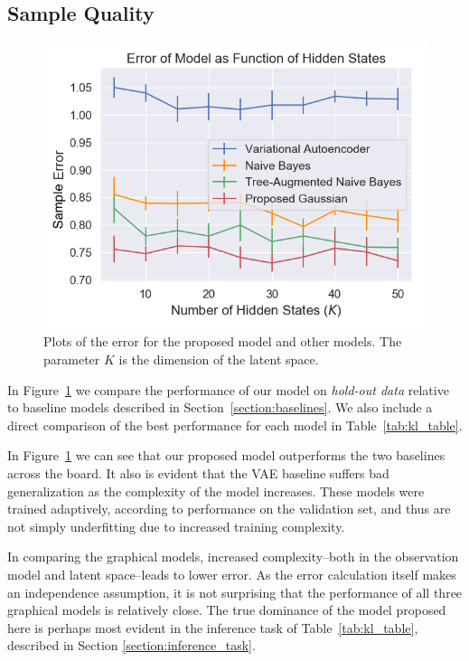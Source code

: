 \documentclass{edm_template}
\begin{document}
\subsection{Sample Quality}

\begin{figure}%
    \centering
    \includegraphics[scale=0.5]{figures/error_plot.png}
    
    \caption{Plots of the error for the proposed model and other models. The parameter $K$ is the dimension of the latent space.}
    \label{fig:kl_plot}
\end{figure}

In Figure~\ref{fig:kl_plot} we compare the performance of our model on \textit{hold-out data} relative to baseline models described in Section~\ref{section:baselines}. We also include a direct comparison of the best performance for each model in Table~\ref{tab:kl_table}. 

In Figure~\ref{fig:kl_plot} we can see that our proposed model outperforms the two baselines across the board. It also is evident that the VAE baseline suffers bad generalization as the complexity of the model increases. These models were trained adaptively, according to performance on the validation set, and thus are not simply underfitting due to increased training complexity. 

In comparing the graphical models, increased complexity--both in the observation model and latent space--leads to lower error. As the error calculation itself makes an independence assumption, it is not surprising that the performance of all three graphical models is relatively close. The true dominance of the model proposed here is perhaps most evident in the inference task of Table~\ref{tab:kl_table}, described in Section \ref{section:inference_task}. 
\end{document}
